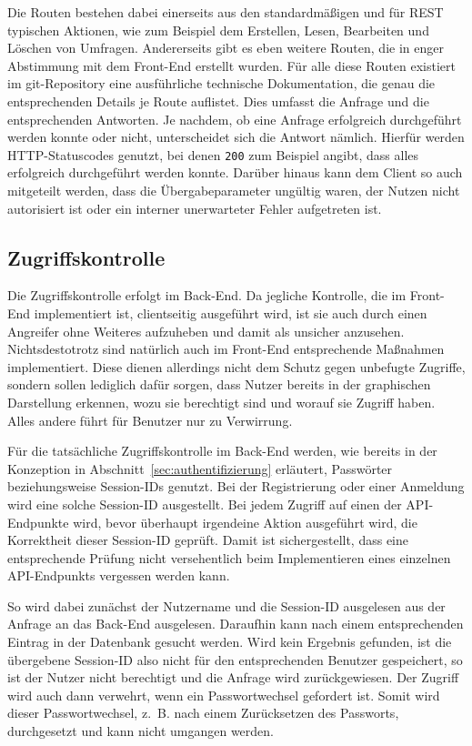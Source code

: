 Die Routen bestehen dabei einerseits aus den standardmäßigen und für \acs{REST} typischen Aktionen, wie zum Beispiel dem Erstellen, Lesen, Bearbeiten und Löschen von Umfragen.
Andererseits gibt es eben weitere Routen, die in enger Abstimmung mit dem Front-End erstellt wurden.
Für alle diese Routen existiert im git-Repository eine ausführliche technische Dokumentation, die genau die entsprechenden Details je Route auflistet.
Dies umfasst die Anfrage und die entsprechenden Antworten.
Je nachdem, ob eine Anfrage erfolgreich durchgeführt werden konnte oder nicht, unterscheidet sich die Antwort nämlich.
Hierfür werden \acs{HTTP}-Statuscodes genutzt, bei denen \texttt{200} zum Beispiel angibt, dass alles erfolgreich durchgeführt werden konnte.
Darüber hinaus kann dem Client so auch mitgeteilt werden, dass die Übergabeparameter ungültig waren, der Nutzen nicht autorisiert ist oder ein interner unerwarteter Fehler aufgetreten ist.\autocite[Vgl.][S. 51 ff]{nl-rfc7231}

\subsection{Zugriffskontrolle}
Die Zugriffskontrolle erfolgt im Back-End.
Da jegliche Kontrolle, die im Front-End implementiert ist, clientseitig ausgeführt wird, ist sie auch durch einen Angreifer ohne Weiteres aufzuheben und damit als unsicher anzusehen.
Nichtsdestotrotz sind natürlich auch im Front-End entsprechende Maßnahmen implementiert.
Diese dienen allerdings nicht dem Schutz gegen unbefugte Zugriffe, sondern sollen lediglich dafür sorgen, dass Nutzer bereits in der graphischen Darstellung erkennen, wozu sie berechtigt sind und worauf sie Zugriff haben.
Alles andere führt für Benutzer nur zu Verwirrung.

Für die tatsächliche Zugriffskontrolle im Back-End werden, wie bereits in der Konzeption in Abschnitt~\ref{sec:authentifizierung} erläutert, Passwörter beziehungsweise Session-IDs genutzt.
Bei der Registrierung oder einer Anmeldung wird eine solche Session-ID ausgestellt.
Bei jedem Zugriff auf einen der \acs{API}-Endpunkte wird, bevor überhaupt irgendeine Aktion ausgeführt wird, die Korrektheit dieser Session-ID geprüft.
Damit ist sichergestellt, dass eine entsprechende Prüfung nicht versehentlich beim Implementieren eines einzelnen \acs{API}-Endpunkts vergessen werden kann.

So wird dabei zunächst der Nutzername und die Session-ID ausgelesen aus der Anfrage an das Back-End ausgelesen.
Daraufhin kann nach einem entsprechenden Eintrag in der Datenbank gesucht werden.
Wird kein Ergebnis gefunden, ist die übergebene Session-ID also nicht für den entsprechenden Benutzer gespeichert, so ist der Nutzer nicht berechtigt und die Anfrage wird zurückgewiesen.
Der Zugriff wird auch dann verwehrt, wenn ein Passwortwechsel gefordert ist.
Somit wird dieser Passwortwechsel, z.~B. nach einem Zurücksetzen des Passworts, durchgesetzt und kann nicht umgangen werden.

